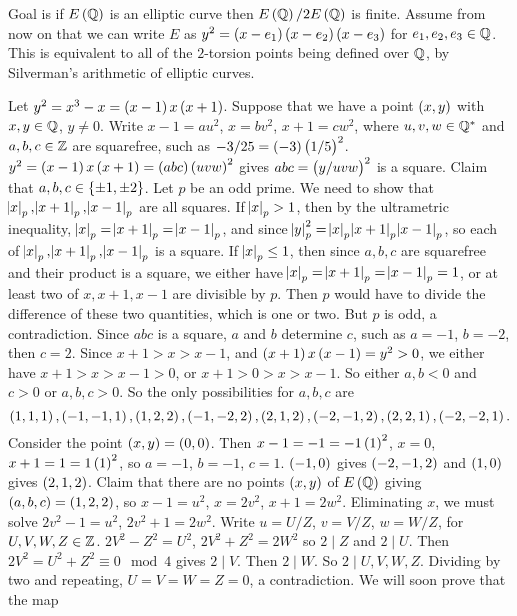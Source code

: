 
Goal is if $ E\br{\Q} $ is an elliptic curve then $ E\br{\Q} / 2E\br{\Q} $ is finite. Assume from now on that we can write $ E $ as $ y^2 = \br{x - e_1}\br{x - e_2}\br{x - e_3} $ for $ e_1, e_2, e_3 \in \mathbb{Q} $. This is equivalent to all of the $ 2 $-torsion points being defined over $ \mathbb{Q} $, by Silverman's arithmetic of elliptic curves.

\begin{example*}
Let $ y^2 = x^3 - x = \br{x - 1}x\br{x + 1} $. Suppose that we have a point $ \br{x, y} $ with $ x, y \in \mathbb{Q} $, $ y \ne 0 $. Write $ x - 1 = au^2 $, $ x = bv^2 $, $ x + 1 = cw^2 $, where $ u, v, w \in \mathbb{Q}^* $ and $ a, b, c \in \mathbb{Z} $ are squarefree, such as $ -3 / 25 = \br{-3}\br{1 / 5}^2 $. $ y^2 = \br{x - 1}x\br{x + 1} = \br{abc}\br{uvw}^2 $ gives $ abc = \br{y / uvw}^2 $ is a square. Claim that $ a, b, c \in \cbr{\pm 1, \pm 2} $. Let $ p $ be an odd prime. We need to show that $ \abs{x}_p, \abs{x + 1}_p, \abs{x - 1}_p $ are all squares. If $ \abs{x}_p > 1 $, then by the ultrametric inequality, $ \abs{x}_p = \abs{x + 1}_p = \abs{x - 1}_p $, and since $ \abs{y}_p^2 = \abs{x}_p\abs{x + 1}_p\abs{x - 1}_p $, so each of $ \abs{x}_p, \abs{x + 1}_p, \abs{x - 1}_p $ is a square. If $ \abs{x}_p \le 1 $, then since $ a, b, c $ are squarefree and their product is a square, we either have $ \abs{x}_p = \abs{x + 1}_p = \abs{x - 1}_p = 1 $, or at least two of $ x, x + 1, x - 1 $ are divisible by $ p $. Then $ p $ would have to divide the difference of these two quantities, which is one or two. But $ p $ is odd, a contradiction. Since $ abc $ is a square, $ a $ and $ b $ determine $ c $, such as $ a = -1 $, $ b = -2 $, then $ c = 2 $. Since $ x + 1 > x > x - 1 $, and $ \br{x + 1}x\br{x - 1} = y^2 > 0 $, we either have $ x + 1 > x > x - 1 > 0 $, or $ x + 1 > 0 > x > x - 1 $. So either $ a, b < 0 $ and $ c > 0 $ or $ a, b, c > 0 $. So the only possibilities for $ a, b, c $ are
$$ \br{1, 1, 1}, \br{-1, -1, 1}, \br{1, 2, 2}, \br{-1, -2, 2}, \br{2, 1, 2}, \br{-2, -1, 2}, \br{2, 2, 1}, \br{-2, -2, 1}. $$
Consider the point $ \br{x, y} = \br{0, 0} $. Then $ x - 1 = -1 = -1\br{1}^2 $, $ x = 0 $, $ x + 1 = 1 = 1\br{1}^2 $, so $ a = -1 $, $ b = -1 $, $ c = 1 $. $ \br{-1, 0} $ gives $ \br{-2, -1, 2} $ and $ \br{1, 0} $ gives $ \br{2, 1, 2} $. Claim that there are no points $ \br{x, y} $ of $ E\br{\Q} $ giving $ \br{a, b, c} = \br{1, 2, 2} $, so $ x - 1 = u^2 $, $ x = 2v^2 $, $ x + 1 = 2w^2 $. Eliminating $ x $, we must solve $ 2v^2 - 1 = u^2 $, $ 2v^2 + 1 = 2w^2 $. Write $ u = U / Z $, $ v = V / Z $, $ w = W / Z $, for $ U, V, W, Z \in \mathbb{Z} $. $ 2V^2 - Z^2 = U^2 $, $ 2V^2 + Z^2 = 2W^2 $ so $ 2 \mid Z $ and $ 2 \mid U $. Then $ 2V^2 = U^2 + Z^2 \equiv 0 \mod 4 $ gives $ 2 \mid V $. Then $ 2 \mid W $. So $ 2 \mid U, V, W, Z $. Dividing by two and repeating, $ U = V = W = Z = 0 $, a contradiction. We will soon prove that the map

\end{example*}
